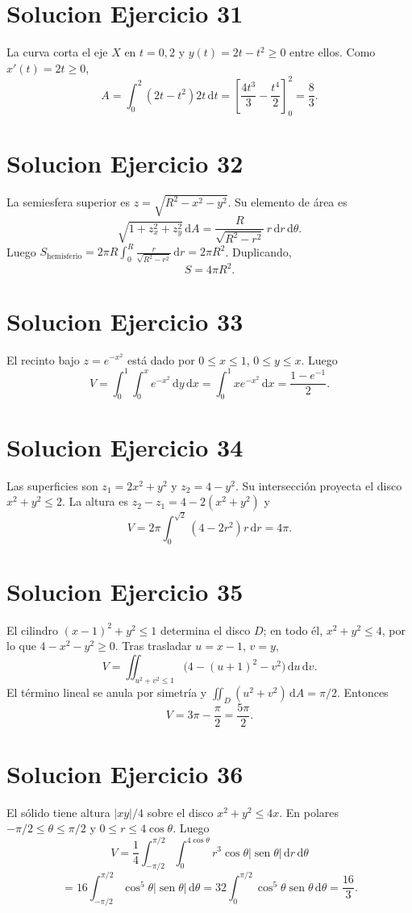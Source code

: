 \documentclass[11pt,a4paper]{article}
\DeclareMathOperator{\sen}{sen}
\newcommand{\dd}{\,\mathrm{d}}
\begin{document}
\section{Solucion Ejercicio 31}
La curva corta el eje $X$ en $t=0,2$ y $y(t)=2t-t^2\ge0$ entre ellos. Como $x'(t)=2t\ge0$,
\[A=\int_0^2(2t-t^2)2t\dd t=\left[\frac{4t^3}{3}-\frac{t^4}2\right]_0^2=\boxed{\frac83}.\]

\section{Solucion Ejercicio 32}
La semiesfera superior es $z=\sqrt{R^2-x^2-y^2}$. Su elemento de área es
\[\sqrt{1+z_x^2+z_y^2}\dd A=\frac{R}{\sqrt{R^2-r^2}}\,r\dd r\dd\theta.\]
Luego $S_{\text{hemisferio}}=2\pi R\int_0^R\frac{r}{\sqrt{R^2-r^2}}\dd r=2\pi R^2$. Duplicando,
\[\boxed{S=4\pi R^2}.\]

\section{Solucion Ejercicio 33}
El recinto bajo $z=e^{-x^2}$ está dado por $0\le x\le1$, $0\le y\le x$. Luego
\[V=\int_0^1\int_0^x e^{-x^2}\dd y\dd x=\int_0^1xe^{-x^2}\dd x=\boxed{\frac{1-e^{-1}}2}.\]

\section{Solucion Ejercicio 34}
Las superficies son $z_1=2x^2+y^2$ y $z_2=4-y^2$. Su intersección proyecta el disco $x^2+y^2\le2$. La altura es $z_2-z_1=4-2(x^2+y^2)$ y
\[V=2\pi\int_0^{\sqrt2}(4-2r^2)r\dd r=\boxed{4\pi}.\]

\section{Solucion Ejercicio 35}
El cilindro $(x-1)^2+y^2\le1$ determina el disco $D$; en todo él, $x^2+y^2\le4$, por lo que $4-x^2-y^2\ge0$. Tras trasladar $u=x-1$, $v=y$,
\[V=\iint_{u^2+v^2\le1}\bigl(4-(u+1)^2-v^2\bigr)\dd u\dd v.\]
El término lineal se anula por simetría y $\iint_D(u^2+v^2)\dd A=\pi/2$. Entonces
\[V=3\pi-\frac\pi2=\boxed{\frac{5\pi}{2}}.\]

\section{Solucion Ejercicio 36}
El sólido tiene altura $|xy|/4$ sobre el disco $x^2+y^2\le4x$. En polares $-\pi/2\le\theta\le\pi/2$ y $0\le r\le4\cos\theta$. Luego
\[V=\frac14\int_{-\pi/2}^{\pi/2}\int_0^{4\cos\theta}r^3\cos\theta|\sen\theta|\dd r\dd\theta\]
\[=16\int_{-\pi/2}^{\pi/2}\cos^5\theta|\sen\theta|\dd\theta=32\int_0^{\pi/2}\cos^5\theta\sen\theta\dd\theta=\boxed{\frac{16}{3}}.\]
\end{document}
